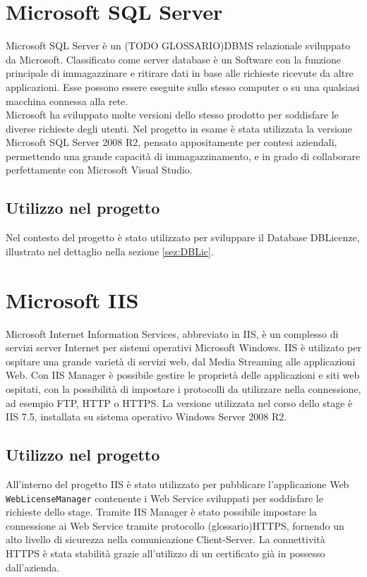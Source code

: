 \section{Microsoft SQL Server}

Microsoft SQL Server è un (TODO GLOSSARIO)DBMS relazionale sviluppato da Microsoft. Classificato come server database è un Software con la funzione principale di immagazzinare e ritirare dati in base alle richieste ricevute da altre applicazioni. Esse possono essere eseguite sullo stesso computer o su una qualsiasi macchina connessa alla rete.
\\
Microsoft ha sviluppato molte versioni dello stesso prodotto per soddisfare le diverse richieste degli utenti. Nel progetto in esame è stata utilizzata la versione Microsoft SQL Server 2008 R2, pensato appositamente per contesi aziendali, permettendo una grande capacità di immagazzinamento, e in grado di collaborare perfettamente con Microsoft Visual Studio.

\subsection{Utilizzo nel progetto}

Nel contesto del progetto è stato utilizzato per sviluppare il Database DBLicenze, illustrato nel dettaglio nella sezione \ref{sez:DBLic}.

\section{Microsoft IIS}

Microsoft Internet Information Services, abbreviato in IIS, è un complesso di servizi server Internet per sistemi operativi Microsoft Windows.
IIS è utilizato per ospitare una grande varietà di servizi web, dal Media Streaming alle applicazioni Web. Con IIS Manager è possibile gestire le proprietà delle applicazioni e siti web ospitati, con la possibilità di impostare i protocolli da utilizzare nella connessione, ad esempio FTP, HTTP o HTTPS. 
La versione utilizzata nel corso dello stage è IIS 7.5, installata su sistema operativo Windows Server 2008 R2.


\subsection{Utilizzo nel progetto}
All'interno del progetto IIS è stato utilizzato per pubblicare l'applicazione Web \texttt{WebLicenseManager} contenente i Web Service sviluppati per soddisfare le richieste dello stage. Tramite IIS Manager è stato possibile impostare la connessione ai Web Service tramite protocollo (glossario)HTTPS, fornendo un alto livello di sicurezza nella comunicazione Client-Server. La connettività HTTPS è stata stabilità grazie all'utilizzo di un certificato già in possesso dall'azienda.

